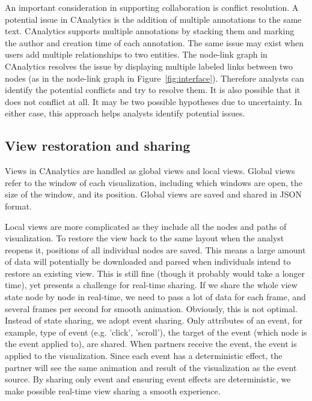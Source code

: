 An important consideration in supporting collaboration is conflict resolution. A potential issue in CAnalytics is the addition of multiple annotations to the same text. CAnalytics supports multiple annotations by stacking them and marking the author and creation time of each annotation. The same issue may exist when users add multiple relationships to two entities. The node-link graph in CAnalytics resolves the issue by displaying multiple labeled links between two nodes (as in the node-link graph in Figure~\ref{fig:interface}). Therefore analysts can identify the potential conflicts and try to resolve them. It is also possible that it does not conflict at all. It may be two possible hypotheses due to uncertainty. In either case, this approach helps analysts identify potential issues. 

\subsection{View restoration and sharing}
Views in CAnalytics are handled as global views and local views. Global views refer to the window of each visualization, including which windows are open, the size of the window, and its position. Global views are saved and shared in JSON format. 

Local views are more complicated as they include all the nodes and paths of visualization. To restore the view back to the same layout when the analyst reopens it, positions of all individual nodes are saved. This means a large amount of data will potentially be downloaded and parsed when individuals intend to restore an existing view. This is still fine (though it probably would take a longer time), yet presents a challenge for real-time sharing. If we share the whole view state node by node in real-time, we need to pass a lot of data for each frame, and several frames per second for smooth animation. Obviously, this is not optimal. Instead of state sharing, we adopt event sharing. Only attributes of an event, for example, type of event (e.g. 'click', 'scroll'), the target of the event (which node is the event applied to), are shared. When partners receive the event, the event is applied to the visualization. Since each event has a deterministic effect, the partner will see the same animation and result of the visualization as the event source. By sharing only event and ensuring event effects are deterministic, we make possible real-time view sharing a smooth experience.